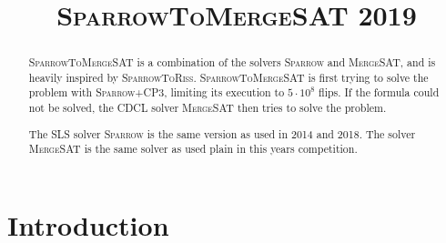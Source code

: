 \documentclass[conference]{IEEEtran}
\begin{document}
	
\title{\textsc{SparrowToMergeSAT} 2019}


\author{
\and
{}
}



\def\cp{\textsc{Coprocessor}\xspace}
\def\cpt{\textsc{CP3}\xspace}
\def\glucose{\textsc{Glucose~2.2}\xspace}
\def\minisat{\textsc{Minisat~2.2}\xspace}
\def\riss{\textsc{Riss}\xspace}
\def\mergesat{\textsc{MergeSAT}\xspace}
\def\sparrow{\textsc{Sparrow}\xspace}
\def\scp{\textsc{Sparrow+CP3}\xspace}
\def\str{\textsc{SparrowToRiss}\xspace}
\def\stm{\textsc{SparrowToMergeSAT}\xspace}

\newcommand{\nnote}[1]{$[$\textcolor{darkred}{norbert}:~~\emph{\textcolor{midgrey}{#1}}$]$}

\maketitle

\begin{abstract}
\stm is a combination of the solvers \sparrow and \mergesat, and is heavily inspired by \str.
\stm is first trying to solve the problem with \scp, limiting its execution to $5\cdot10^8$ flips.
If the formula could not be solved, the CDCL solver \mergesat then tries to solve the problem.

The SLS solver \sparrow is the same version as used in 2014 and 2018.
The solver \mergesat is the same solver as used plain in this years competition.
\end{abstract}

\section{Introduction}
\end{document}
